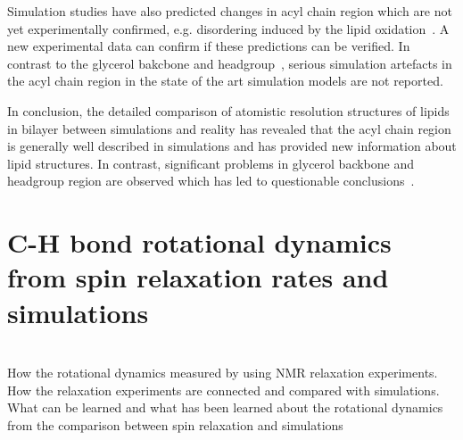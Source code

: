 \documentclass[aps,prl,superscriptaddress,twocolumn]{revtex4}
\begin{document}
Simulation studies have also predicted changes in acyl chain region which are not yet experimentally 
confirmed, e.g. disordering induced by the lipid oxidation~\cite{??}. A new experimental data
can confirm if these predictions can be verified. In contrast to the glycerol bakcbone and headgroup~\cite{??},
serious simulation artefacts in the acyl chain region in the state of the art simulation models are
not reported. 

In conclusion, the detailed comparison of atomistic resolution structures of lipids in bilayer between 
simulations and reality has revealed that the acyl chain region is generally well described in simulations
and has provided new information about lipid structures. In contrast, significant problems
in glycerol backbone and headgroup region are observed which has led to questionable conclusions~\cite{??}.

\section{C-H bond rotational dynamics from spin relaxation rates and simulations}

\\[0.1cm]

\noindent How the rotational dynamics measured by using NMR relaxation experiments. \\
How the relaxation experiments are connected and compared with simulations. \\
What can be learned and what has been learned about the rotational dynamics from the comparison between spin relaxation and simulations \\[0.5 cm]

\end{document}
